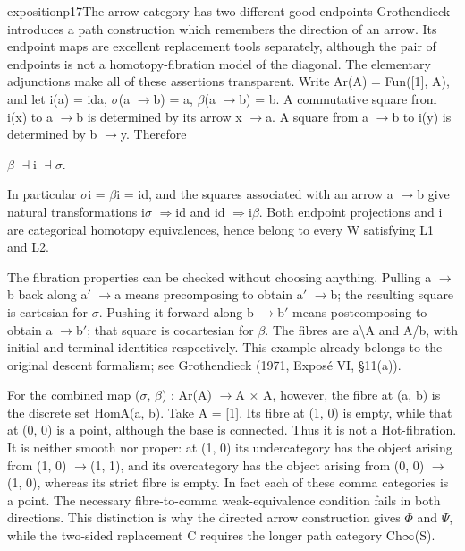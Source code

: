 \begin{dcomment}{exposition}{p17}{The arrow category has two different good endpoints}
Grothendieck introduces a path construction which remembers the direction of an arrow. Its endpoint maps are excellent replacement tools separately, although the pair of endpoints is not a homotopy-fibration model of the diagonal. The elementary adjunctions make all of these assertions transparent. Write Ar(A) = Fun([1], A), and let i(a) = ida, \ensuremath{\sigma}(a \ensuremath{\to}b) = a, \ensuremath{\beta}(a \ensuremath{\to}b) = b. A commutative square from i(x) to a \ensuremath{\to}b is determined by its arrow x \ensuremath{\to}a. A square from a \ensuremath{\to}b to i(y) is determined by b \ensuremath{\to}y. Therefore

\ensuremath{\beta} \ensuremath{\dashv}i \ensuremath{\dashv}\ensuremath{\sigma}.

In particular \ensuremath{\sigma}i = \ensuremath{\beta}i = id, and the squares associated with an arrow a \ensuremath{\to}b give natural transformations i\ensuremath{\sigma} \ensuremath{\Rightarrow}id and id \ensuremath{\Rightarrow}i\ensuremath{\beta}. Both endpoint projections and i are categorical homotopy equivalences, hence belong to every W satisfying L1 and L2.

The fibration properties can be checked without choosing anything. Pulling a \ensuremath{\to}b back along a\ensuremath{\prime} \ensuremath{\to}a means precomposing to obtain a\ensuremath{\prime} \ensuremath{\to}b; the resulting square is cartesian for \ensuremath{\sigma}. Pushing it forward along b \ensuremath{\to}b\ensuremath{\prime} means postcomposing to obtain a \ensuremath{\to}b\ensuremath{\prime}; that square is cocartesian for \ensuremath{\beta}. The fibres are a\textbackslash{}A and A/b, with initial and terminal identities respectively. This example already belongs to the original descent formalism; see Grothendieck (1971, Exposé VI, \S{}11(a)).

For the combined map (\ensuremath{\sigma}, \ensuremath{\beta}) : Ar(A) \ensuremath{\to}A \ensuremath{\times} A, however, the fibre at (a, b) is the discrete set HomA(a, b). Take A = [1]. Its fibre at (1, 0) is empty, while that at (0, 0) is a point, although the base is connected. Thus it is not a Hot-fibration. It is neither smooth nor proper: at (1, 0) its undercategory has the object arising from (1, 0) \ensuremath{\to}(1, 1), and its overcategory has the object arising from (0, 0) \ensuremath{\to}(1, 0), whereas its strict fibre is empty. In fact each of these comma categories is a point. The necessary fibre-to-comma weak-equivalence condition fails in both directions. This distinction is why the directed arrow construction gives \ensuremath{\Phi} and \ensuremath{\Psi}, while the two-sided replacement C requires the longer path category Ch\ensuremath{\infty}(S).

\end{dcomment}


